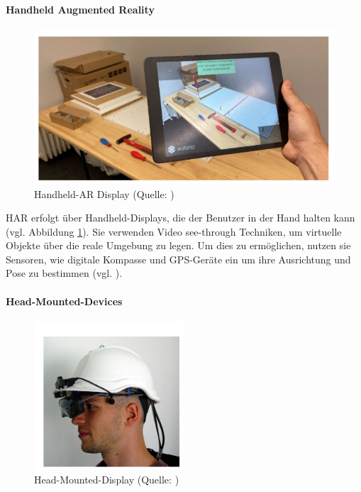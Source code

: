 \paragraph{Handheld Augmented Reality}
\begin{figure}[ht]
\centering
\includegraphics[width=0.5\linewidth]{content/pictures/handheld-ar.PNG}
\caption{Handheld-AR Display (Quelle: \citealp[S. 318]{leins_comparing_2024})}
\label{fig:handheld-ar}
\end{figure}

\ac{HAR} erfolgt über Handheld-Displays, die der Benutzer in der Hand halten kann (vgl. Abbildung \ref{fig:handheld-ar}). Sie verwenden Video see-through Techniken, um virtuelle Objekte über die reale Umgebung zu legen. Um dies zu ermöglichen, nutzen sie Sensoren, wie digitale Kompasse und GPS-Geräte ein um ihre Ausrichtung und Pose zu bestimmen (vgl. \citealp[S. 347]{carmigniani_augmented_2011}).

\paragraph{Head-Mounted-Devices}

\begin{figure}[ht]
\centering
\includegraphics[width=0.5\linewidth]{content/pictures/hmd-ar.PNG}
\caption{Head-Mounted-Display (Quelle: \citealp[S. 4]{reitmayr_location_2003})}
\label{fig:hmd-ar}
\end{figure}


